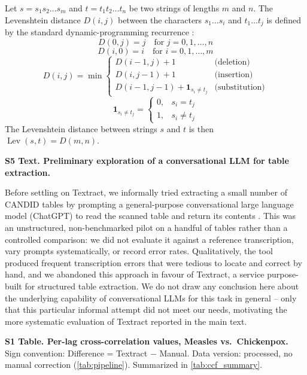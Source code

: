 \documentclass[12pt]{article}
\begin{document}
Let $s = s_1 s_2 \dots s_m$ and $t = t_1 t_2 \dots t_n$ be two strings of lengths $m$ and $n$. The Levenshtein distance $D(i,j)$ between the characters $s_1 \dots s_i$ and $t_1 \dots t_j$ is defined by the standard dynamic-programming recurrence \cite{wagner1974string}:
\[
D(0,j) = j \quad \text{for } j = 0,1,\dots,n
\]
\[
D(i,0) = i \quad \text{for } i = 0,1,\dots,m
\]
\[
D(i,j) =
\min \begin{cases}
D(i-1,j) + 1 & \text{(deletion)} \\
D(i,j-1) + 1 & \text{(insertion)} \\
D(i-1,j-1) + \mathbf{1}_{s_i \neq t_j} & \text{(substitution)}
\end{cases}
\]
\[
\mathbf{1}_{s_i \neq t_j} =
\begin{cases}
0, & s_i = t_j \\
1, & s_i \neq t_j
\end{cases}
\]
The Levenshtein distance between strings $s$ and $t$ is then $\operatorname{Lev}(s,t) = D(m,n)$.

\bigskip
\noindent\textbf{S5 Text. Preliminary exploration of a conversational LLM for table extraction.}\label{sec:chatgpt-pilot}

Before settling on Textract, we informally tried extracting a small number of CANDID tables by prompting a general-purpose conversational large language model (ChatGPT) to read the scanned table and return its contents \cite{stewart}. This was an unstructured, non-benchmarked pilot on a handful of tables rather than a controlled comparison: we did not evaluate it against a reference transcription, vary prompts systematically, or record error rates. Qualitatively, the tool produced frequent transcription errors that were tedious to locate and correct by hand, and we abandoned this approach in favour of Textract, a service purpose-built for structured table extraction. We do not draw any conclusion here about the underlying capability of conversational LLMs for this task in general -- only that this particular informal attempt did not meet our needs, motivating the more systematic evaluation of Textract reported in the main text.

\bigskip
\noindent\textbf{S1 Table. Per-lag cross-correlation values, Measles vs.\ Chickenpox.} Sign convention: Difference = Textract $-$ Manual. Data version: processed, no manual correction (\cref{tab:pipeline}). Summarized in \cref{tab:ccf_summary}.
\end{document}
